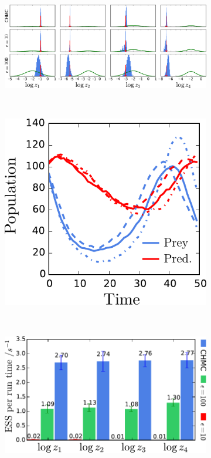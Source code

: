 \begin{figure}[!t]
\centering
\begin{subfigure}[b]{0.85\textwidth}
  \centering
  \caption{}
  \includegraphics[width=\textwidth]{images/lotka-volterra-marginals-with-prior}
  \label{sfig:lotka-volterra-marginals}
\end{subfigure}\\
\begin{subfigure}[b]{0.33\textwidth}
  \includegraphics[width=\textwidth]{images/lotka-volterra-sims.pdf}
  \caption{}
  \label{sfig:lotka-volterra-sims}
\end{subfigure}
~~~~
\begin{subfigure}[b]{0.52\textwidth}
  \includegraphics[width=\textwidth]{images/lotka-volterra-ess.pdf}

\end{subfigure}
\end{figure}
